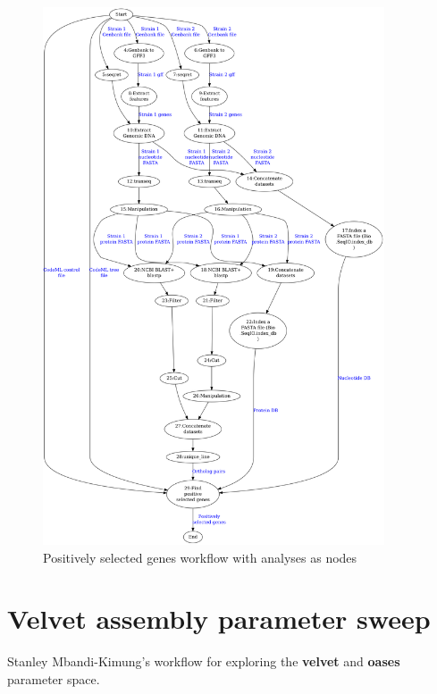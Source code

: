 \documentclass[a4paper,10pt]{scrreprt} \usepackage[utf8]{inputenc}
\begin{document}
\begin{figure}[h!]
\centering
\includegraphics[width=0.9\textwidth]{images/positive_selection_workflow_analyses_graph.png}
\caption{Positively selected genes workflow with analyses as nodes}
\label{fig:positive_selection_workflow_analyses_graph}
\end{figure}

\chapter{Velvet assembly parameter sweep}

\label{sec:velvet_assembly_parameter_walk}

Stanley Mbandi-Kimung's workflow for exploring the \textbf{velvet} and \textbf{oases} parameter space.


\end{document}
